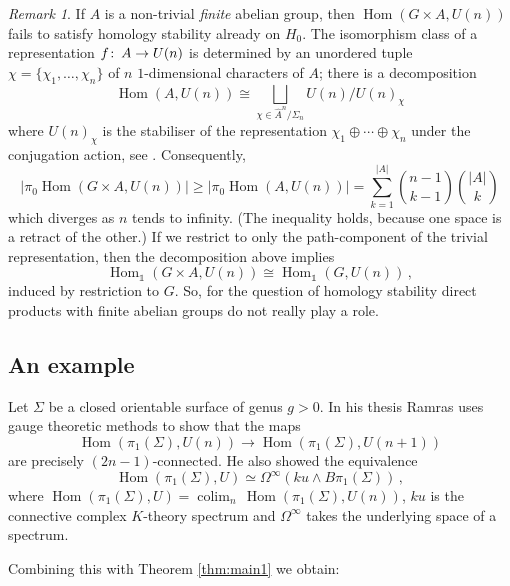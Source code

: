 \documentclass[oneside, a4paper, 12pt]{article}
\numberwithin{equation}{section}
\DeclareMathOperator{\Hom}{Hom}
\newcommand{\colim}{\operatorname{colim}}
\newcommand{\co}{\colon\thinspace}
\theoremstyle{plain}
\theoremstyle{definition}
\theoremstyle{remark}
\newtheorem{remark}[theorem]{Remark}
\begin{document}
\begin{remark} \label{rem:finitegroup} If $A$ is a non-trivial \emph{finite} abelian group, then $\Hom(G\times A,U(n))$ fails to satisfy homology stability already on $H_0$.  The isomorphism class of a representation $f\co A\to U(n)$ is determined by an unordered tuple $\chi=\{\chi_1,\dots,\chi_n\}$ of $n$ $1$-dimensional characters of $A$; there is a decomposition
\[
\Hom(A,U(n))\cong \bigsqcup_{\chi \in \widehat{A}^n/\Sigma_n} U(n)/U(n)_{\chi}
\]
where $U(n)_\chi$ is the stabiliser of the representation $\chi_1\oplus \cdots \oplus \chi_n$ under the conjugation action, see \cite[Proposition 2.5]{AG}. Consequently, 
\[
|\pi_0\Hom(G\times A,U(n))|\geq |\pi_0\Hom(A,U(n))| = \sum_{k=1}^{|A|} \binom{n-1}{k-1} \binom{|A|}{k}
\]
which diverges as $n$ tends to infinity. (The inequality holds, because one space is a retract of the other.) If we restrict to only the path-component of the trivial representation, then the decomposition above implies
\[
\Hom_{\mathds{1}}(G\times A,U(n)) \cong \Hom_{\mathds{1}}(G,U(n))\,,
\]
induced by restriction to $G$. So, for the question of homology stability direct products with finite abelian groups do not really play a role.
\end{remark}


\subsection{An example} \label{sec:examples}


Let $\Sigma$ be a closed orientable surface of genus $g>0$. In his thesis \cite[Section 4.5]{RThesis} Ramras uses gauge theoretic methods to show that the maps
\[
\Hom(\pi_1(\Sigma),U(n)) \to \Hom(\pi_1(\Sigma),U(n+1))
\]
are precisely $(2n-1)$-connected. He also showed the equivalence
\begin{equation} \label{eq:surfacestable}
\Hom(\pi_1(\Sigma),U)\simeq \Omega^\infty(ku\wedge B\pi_1(\Sigma))\, ,
\end{equation}
where $\Hom(\pi_1(\Sigma),U)=\colim_n\, \Hom(\pi_1(\Sigma),U(n))$, $ku$ is the connective complex $K$-theory spectrum and $\Omega^\infty$ takes the underlying space of a spectrum.

Combining this with Theorem \ref{thm:main1} we obtain:
\end{document}
